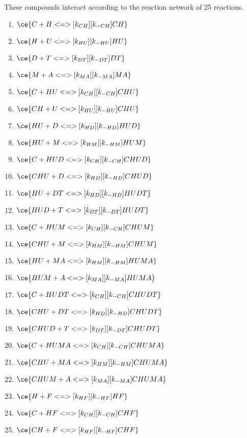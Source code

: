 These compounds interact according to the reaction network of 25 reactions.

\begin{enumerate}

\item $\ce{C + H <=>[k_{CH}][k_{-CH}] CH}$ %
\item $\ce{H + U <=>[k_{HU}][k_{-HU}] HU}$ %
\item $\ce{D + T <=>[k_{DT}][k_{-DT}] DT}$ %
\item $\ce{M + A <=>[k_{MA}][k_{-MA}] MA}$ %

\item $\ce{C + HU <=>[k_{CH}][k_{-CH}] CHU}$ %
\item $\ce{CH + U <=>[k_{HU}][k_{-HU}] CHU}$ %
\item $\ce{HU + D <=>[k_{HD}][k_{-HD}] HUD}$ %
\item $\ce{HU + M <=>[k_{HM}][k_{-HM}] HUM}$ %

\item $\ce{C + HUD <=>[k_{CH}][k_{-CH}] CHUD}$ %
\item $\ce{CHU + D <=>[k_{HD}][k_{-HD}] CHUD}$ %
\item $\ce{HU + DT <=>[k_{HD}][k_{-HD}] HUDT}$ %
\item $\ce{HUD + T <=>[k_{DT}][k_{-DT}] HUDT}$ %
\item $\ce{C + HUM <=>[k_{CH}][k_{-CH}] CHUM}$ %
\item $\ce{CHU + M <=>[k_{HM}][k_{-HM}] CHUM}$ %
\item $\ce{HU + MA <=>[k_{HM}][k_{-HM}] HUMA}$ %
\item $\ce{HUM + A <=>[k_{MA}][k_{-MA}] HUMA}$ %

\item $\ce{C + HUDT <=>[k_{CH}][k_{-CH}] CHUDT}$ %
\item $\ce{CHU + DT <=>[k_{HD}][k_{-HD}] CHUDT}$ %
\item $\ce{CHUD + T <=>[k_{DT}][k_{-DT}] CHUDT}$ %
\item $\ce{C + HUMA <=>[k_{CH}][k_{-CH}] CHUMA}$ %
\item $\ce{CHU + MA <=>[k_{HM}][k_{-HM}] CHUMA}$ %
\item $\ce{CHUM + A <=>[k_{MA}][k_{-MA}] CHUMA}$ %

\item $\ce{H + F <=>[k_{HF}][k_{-HF}] HF}$ %
\item $\ce{C + HF <=>[k_{CH}][k_{-CH}] CHF}$ %
\item $\ce{CH + F <=>[k_{HF}][k_{-HF}] CHF}$ %
\end{enumerate}

